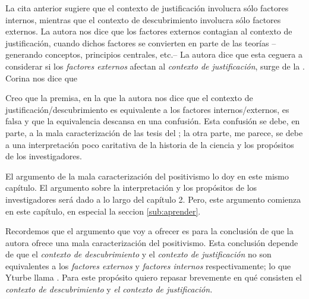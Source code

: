 La cita anterior sugiere que el contexto de justificación involucra sólo factores internos, mientras que el contexto de descubrimiento involucra sólo factores externos.
La autora nos dice que los factores externos contagian al contexto de justificación, cuando dichos factores se convierten en parte de las teorías --generando conceptos, principios centrales, etc.--
La autora dice que esta ceguera a considerar si los \emph{factores externos} afectan al \emph{contexto de justificación}, surge de la . 
Corina nos dice que  \parencite[p. 75]{Yturbe1995}

Creo que la premisa, en la que la autora nos dice que el contexto de justificación/descubrimiento es equivalente a los factores internos/externos, es falsa y que la equivalencia descansa en una confusión.
Esta confusión se debe, en parte, a la mala caracterización de las tesis del ; la otra parte, me parece, se debe a una interpretación poco caritativa de la historia de la ciencia y los propósitos de los investigadores.

El argumento de la mala caracterización del positivismo lo doy en este mismo capítulo.
El argumento sobre la interpretación y los propósitos de los investigadores será dado a lo largo del capítulo 2.
Pero, este argumento comienza en este capítulo, en especial la seccion \ref{sub:aprender}.

Recordemos que el argumento que voy a ofrecer es para la conclusión de que la autora ofrece una mala caracterización del positivismo.
Esta conclusión depende de que el \emph{contexto de descubrimiento} y el \emph{contexto de justificación} no son equivalentes a los \emph{factores externos} y \emph{factores internos}  respectivamente; lo que Yturbe llama .
Para este propósito quiero repasar brevemente en qué consisten el \emph{contexto de descubrimiento} y \emph{el contexto de justificación.}



